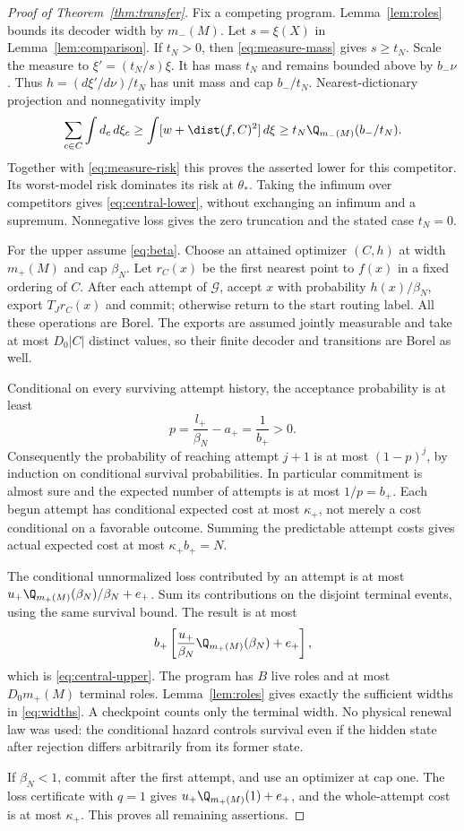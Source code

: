 \begin{proof}[Proof of Theorem~\ref{thm:transfer}]
Fix a competing program. Lemma~\ref{lem:roles} bounds its decoder width by $m_-(M)$. Let $s=\xi(X)$ in Lemma~\ref{lem:comparison}. If $t_N>0$, then \eqref{eq:measure-mass} gives $s\ge t_N$. Scale the measure to $\xi'=(t_N/s)\xi$. It has mass $t_N$ and remains bounded above by $b_-\nu$. Thus $h=(d\xi'/d\nu)/t_N$ has unit mass and cap $b_-/t_N$. Nearest-dictionary projection and nonnegativity imply
\[
 \sum_{c\in C}\int d_c\,d\xi_c
 \ge\int [w+\dist(f,C)^2]\,d\xi
 \ge t_N\Q_{m_-(M)}(b_-/t_N).
\]
Together with \eqref{eq:measure-risk} this proves the asserted lower for this competitor. Its worst-model risk dominates its risk at $\theta_*$. Taking the infimum over competitors gives \eqref{eq:central-lower}, without exchanging an infimum and a supremum. Nonnegative loss gives the zero truncation and the stated case $t_N=0$.

For the upper assume \eqref{eq:beta}. Choose an attained optimizer $(C,h)$ at width $m_+(M)$ and cap $\beta_N$. Let $r_C(x)$ be the first nearest point to $f(x)$ in a fixed ordering of $C$. After each attempt of $\mathcal G$, accept $x$ with probability $h(x)/\beta_N$, export $T_Jr_C(x)$ and commit; otherwise return to the start routing label. All these operations are Borel. The exports are assumed jointly measurable and take at most $D_0|C|$ distinct values, so their finite decoder and transitions are Borel as well.

Conditional on every surviving attempt history, the acceptance probability is at least
\begin{equation}\label{eq:hazard}
 p=\frac{l_+}{\beta_N}-a_+=\frac1{b_+}>0.
\end{equation}
Consequently the probability of reaching attempt $j+1$ is at most $(1-p)^j$, by induction on conditional survival probabilities. In particular commitment is almost sure and the expected number of attempts is at most $1/p=b_+$. Each begun attempt has conditional expected cost at most $\kappa_+$, not merely a cost conditional on a favorable outcome. Summing the predictable attempt costs gives actual expected cost at most $\kappa_+b_+=N$.

The conditional unnormalized loss contributed by an attempt is at most $u_+\Q_{m_+(M)}(\beta_N)/\beta_N+e_+$. Sum its contributions on the disjoint terminal events, using the same survival bound. The result is at most
\[
 b_+\left[\frac{u_+}{\beta_N}\Q_{m_+(M)}(\beta_N)+e_+\right],
\]
which is \eqref{eq:central-upper}. The program has $B$ live roles and at most $D_0m_+(M)$ terminal roles. Lemma~\ref{lem:roles} gives exactly the sufficient widths in \eqref{eq:widths}. A checkpoint counts only the terminal width. No physical renewal law was used: the conditional hazard controls survival even if the hidden state after rejection differs arbitrarily from its former state.

If $\beta_N<1$, commit after the first attempt, and use an optimizer at cap one. The loss certificate with $q=1$ gives $u_+\Q_{m_+(M)}(1)+e_+$, and the whole-attempt cost is at most $\kappa_+$. This proves all remaining assertions.
\end{proof}
